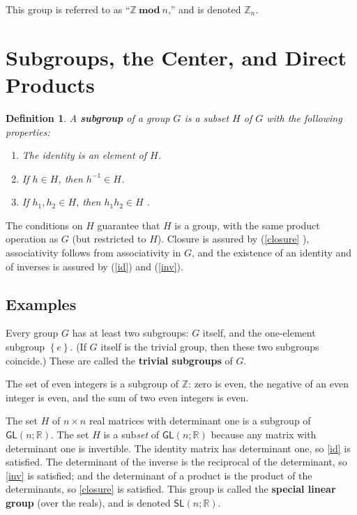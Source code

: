 \documentclass[12pt]{amsbook}
\theoremstyle{plain}
\newtheorem{definition}[theorem]{Definition}
\numberwithin{equation}{chapter}
\numberwithin{theorem}{chapter}
\begin{document}
This group is referred to as ``$\mathbb{Z}\mathbf{\ mod\ }n$,'' and is denoted
$\mathbb{Z}_{n}$.

\section{Subgroups, the Center, and Direct Products\label{sub}}

\begin{definition}
A \textbf{subgroup} of a group $G$ is a subset $H$ of $G$ with the following properties:

\begin{enumerate}
\item \label{id}The identity is an element of $H$.

\item \label{inv}If $h\in H$, then $h^{-1}\in H$.

\item \label{closure}If $h_{1},h_{2}\in H$, then $h_{1}h_{2}\in H$ .
\end{enumerate}
\end{definition}

The conditions on $H$ guarantee that $H$ is a group, with the same product
operation as $G$ (but restricted to $H$). Closure is assured by (\ref{closure}%
), associativity follows from associativity in $G$, and the existence of an
identity and of inverses is assured by (\ref{id}) and (\ref{inv}).

\subsection{Examples}

Every group $G$ has at least two subgroups: $G$ itself, and the one-element
subgroup $\left\{  e\right\}  $. (If $G$ itself is the trivial group, then
these two subgroups coincide.) These are called the \textbf{trivial subgroups}
of $G$.

The set of even integers is a subgroup of $\mathbb{Z}$: zero is even, the
negative of an even integer is even, and the sum of two even integers is even.

The set $H$ of $n\times n$ real matrices with determinant one is a subgroup of
$\mathsf{GL}(n;\mathbb{R})$. The set $H$ is a sub\textit{set} of
$\mathsf{GL}(n;\mathbb{R})$ because any matrix with determinant one is
invertible. The identity matrix has determinant one, so \ref{id} is satisfied.
The determinant of the inverse is the reciprocal of the determinant, so
\ref{inv} is satisfied; and the determinant of a product is the product of the
determinants, so \ref{closure} is satisfied. This group is called the
\textbf{special linear group} (over the reals), and is denoted $\mathsf{SL}%
(n;\mathbb{R})$.
\end{document}
